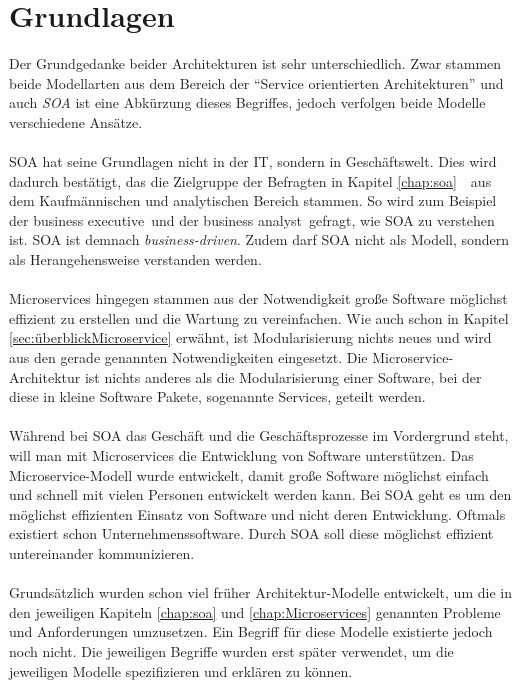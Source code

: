 \section{Grundlagen}
\label{sec:FazitGrundlagen}
Der Grundgedanke beider Architekturen ist sehr unterschiedlich. Zwar stammen beide Modellarten aus dem Bereich der "`Service orientierten Architekturen"' und auch \textit{SOA} ist eine Abkürzung dieses Begriffes, jedoch verfolgen beide Modelle verschiedene Ansätze.  
\\\\
SOA hat seine Grundlagen nicht in der IT, sondern in Geschäftswelt. Dies wird dadurch bestätigt, das die Zielgruppe der Befragten in Kapitel \ref{chap:soa}\ \ aus dem Kaufmännischen und analytischen Bereich stammen. So wird zum Beispiel der \flqq business executive\frqq\ und der \flqq business analyst\frqq\ gefragt, wie SOA zu verstehen ist. SOA ist demnach \textit{business-driven}. Zudem darf SOA nicht als Modell, sondern als Herangehensweise verstanden werden.
\\\\
Microservices hingegen stammen aus der Notwendigkeit große Software möglichst effizient zu erstellen und die Wartung zu vereinfachen. Wie auch schon in Kapitel \ref{sec:überblickMicroservice}  erwähnt, ist Modularisierung nichts neues und wird aus den gerade genannten Notwendigkeiten eingesetzt. Die Microservice-Architektur ist nichts anderes als die Modularisierung einer Software, bei der diese in kleine Software Pakete, sogenannte Services, geteilt werden.
\\\\
Während bei SOA das Geschäft und die Geschäftsprozesse im Vordergrund steht, will man mit Microservices die Entwicklung von Software unterstützen. Das Microservice-Modell wurde entwickelt, damit große Software möglichst einfach und schnell mit vielen Personen entwickelt werden kann. Bei SOA geht es um den möglichst effizienten Einsatz von Software und nicht deren Entwicklung. Oftmals existiert schon Unternehmenssoftware. Durch SOA soll diese möglichst effizient untereinander kommunizieren.
\\\\
Grundsätzlich wurden schon viel früher Architektur-Modelle entwickelt, um die in den jeweiligen Kapiteln \ref{chap:soa}  und \ref{chap:Microservices}  genannten Probleme und Anforderungen umzusetzen. Ein Begriff für diese Modelle existierte jedoch noch nicht. Die jeweiligen Begriffe wurden erst später verwendet, um die jeweiligen Modelle spezifizieren und erklären zu können.

